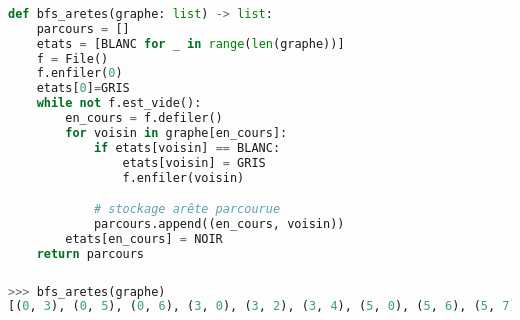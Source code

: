 \documentclass[svgnames,11pt]{beamer}
\begin{document}
\begin{frame}[fragile]
    \frametitle{}
\begin{center}
\begin{lstlisting}[language=Python , basicstyle=\ttfamily\small, xleftmargin=0.2em, xrightmargin=0em]
def bfs_aretes(graphe: list) -> list:
    parcours = []
    etats = [BLANC for _ in range(len(graphe))]
    f = File()
    f.enfiler(0)
    etats[0]=GRIS
    while not f.est_vide():
        en_cours = f.defiler()
        for voisin in graphe[en_cours]:
            if etats[voisin] == BLANC:
                etats[voisin] = GRIS
                f.enfiler(voisin)

            # stockage arête parcourue
            parcours.append((en_cours, voisin))
        etats[en_cours] = NOIR
    return parcours
\end{lstlisting}
\end{center} 

\end{frame}
\begin{frame}[fragile]
    \frametitle{}
    \begin{center}
    \end{center}
\begin{center}
\begin{lstlisting}[language=Python , basicstyle=\ttfamily\small, xleftmargin=0.2em, xrightmargin=0.5em]
>>> bfs_aretes(graphe)
[(0, 3), (0, 5), (0, 6), (3, 0), (3, 2), (3, 4), (5, 0), (5, 6), (5, 7), (6, 0), (6, 5), (6, 7), (2, 1), (2, 3), (2, 4), (4, 2), (4, 3), (7, 5), (7, 6), (7, 8), (1, 2), (1, 9), (8, 7), (9, 1)]
\end{lstlisting}
\label{CODE}
\end{center}

\end{frame}
\end{document}
